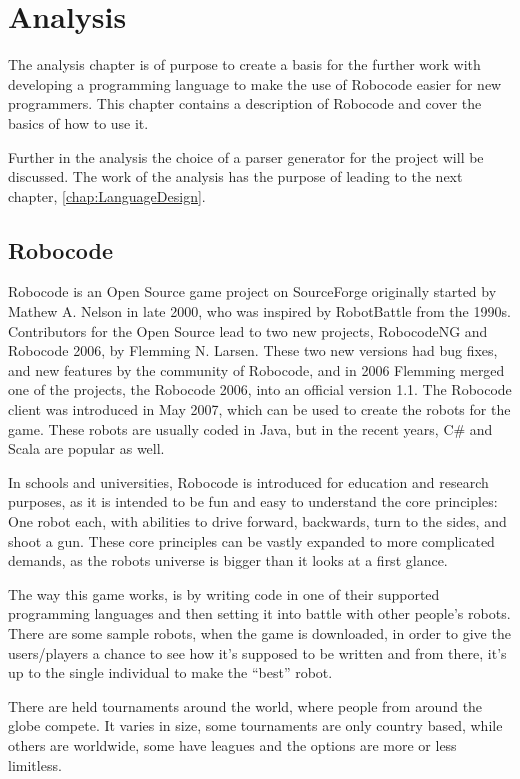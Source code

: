 \chapter{Analysis}
\label{chap:Analysis}
The analysis chapter is of purpose to create a basis for the further work with developing a programming language to make the use of Robocode easier for new programmers. This chapter contains a description of Robocode and cover the basics of how to use it. 

Further in the analysis the choice of a parser generator for the project will be discussed. The work of the analysis has the purpose of leading to the next chapter, \ref{chap:LanguageDesign}.

\section{Robocode}
\label{sec:Robocode}
Robocode is an Open Source game project on SourceForge originally started by Mathew A. Nelson in late 2000, who was inspired by RobotBattle from the 1990s. Contributors for the Open Source lead to two new projects, RobocodeNG and Robocode 2006, by Flemming N. Larsen. These two new versions had bug fixes, and new features by the community of Robocode, and in 2006 Flemming merged one of the projects, the Robocode 2006, into an official version 1.1.
The Robocode client was introduced in May 2007, which can be used to create the robots for the game. These robots are usually coded in Java, but in the recent years, C\# and Scala are popular as well. \citep{robocode}

In schools and universities, Robocode is introduced for education and research purposes, as it is intended to be fun and easy to understand the core principles: One robot each, with abilities to drive forward, backwards, turn to the sides, and shoot a gun. These core principles can be vastly expanded to more complicated demands, as the robots universe is bigger than it looks at a first glance. \citep{RoboReadMe}

The way this game works, is by writing code in one of their supported programming languages and then setting it into battle with other people’s robots. There are some sample robots, when the game is downloaded, in order to give the users/players a chance to see how it’s supposed to be written and from there, it’s up to the single individual to make the “best” robot. \citep{MyFirstRobot}

There are held tournaments around the world, where people from around the globe compete. It varies in size, some tournaments are only country based, while others are worldwide, some have leagues and the options are more or less limitless. \citep{rc}


